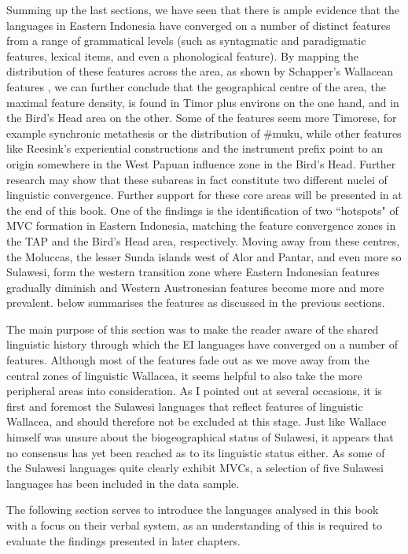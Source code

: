 Summing up the last sections, we have seen that there is ample evidence that the languages in Eastern Indonesia have converged on a number of distinct features from a range of grammatical levels (such as syntagmatic and paradigmatic features, lexical items, and even a phonological feature). By mapping the distribution of these features across the area, as shown by Schapper's Wallacean features \citep[138f.]{schapper2015wallacea}, we can further conclude that the geographical centre of the area, the maximal feature density, is found in Timor plus environs on the one hand, and in the Bird's Head area on the other. Some of the features seem more Timorese, for example synchronic metathesis or the distribution of \#muku, while other features like Reesink's experiential constructions and the instrument prefix point to an origin somewhere in the West Papuan influence zone in the Bird's Head. Further research may show that these subareas in fact constitute two different nuclei of linguistic convergence. Further support for these core areas will be presented in  at the end of this book. One of the findings is the identification of two ``hotspots" of MVC formation in Eastern Indonesia, matching the feature convergence zones in the TAP and the Bird's Head area, respectively. Moving away from these centres, the Moluccas, the lesser Sunda islands west of Alor and Pantar, and even more so Sulawesi, form the western transition zone where Eastern Indonesian features gradually diminish and Western Austronesian features become more and more prevalent.  below summarises the features as discussed in the previous sections.

The main purpose of this section was to make the reader aware of the shared linguistic history through which the EI languages have converged on a number of features. Although most of the features fade out as we move away from the central zones of linguistic Wallacea, it seems helpful to also take the more peripheral areas into consideration. As I pointed out at several occasions, it is first and foremost the Sulawesi languages that reflect features of linguistic Wallacea, and should therefore not be excluded at this stage. Just like Wallace himself was unsure about the biogeographical status of Sulawesi, it appears that no consensus has yet been reached as to its linguistic status either. As some of the Sulawesi languages quite clearly exhibit MVCs, a selection of five Sulawesi languages has been included in the data sample. 

The following section serves to introduce the languages analysed in this book with a focus on their verbal system, as an understanding of this is required to evaluate the findings presented in later chapters.

